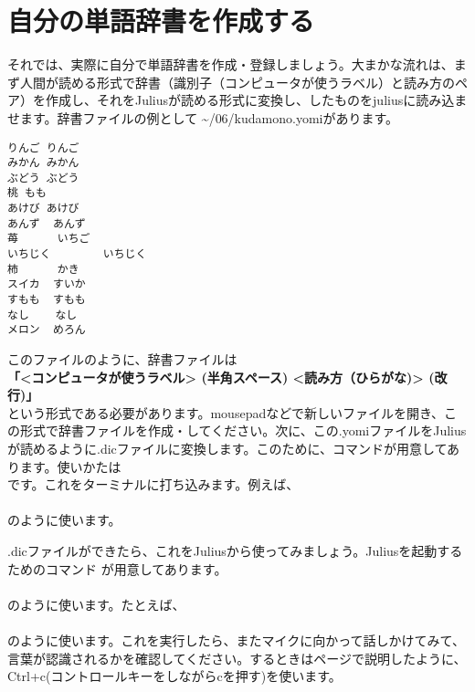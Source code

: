 \newpage
\section{自分の単語辞書を作成する}
それでは、実際に自分で単語辞書を作成・登録しましょう。大まかな流れは、まず人間が読める形式で辞書（識別子（コンピュータが使うラベル）と読み方のペア）を作成し、それをJuliusが読める形式に変換し、したものをjuliusに読み込ませます。辞書ファイルの例として \textasciitilde /06/kudamono.yomiがあります。\\

\begin{lstlisting}[caption=kudamino.yomi,label=kudamino.yomi]
りんご りんご
みかん みかん
ぶどう ぶどう
桃 もも
あけび あけび
あんず  あんず
苺      いちご
いちじく        いちじく
柿      かき
スイカ  すいか
すもも  すもも
なし    なし
メロン  めろん
\end{lstlisting}

このファイルのように、辞書ファイルは\\
\textbf{「<コンピュータが使うラベル> (半角スペース) <読み方（ひらがな)> (改行)」}\\
という形式である必要があります。mousepadなどで新しいファイルを開き、この形式で辞書ファイルを作成・してください。次に、この.yomiファイルをJuliusが読めるように.dicファイルに変換します。このために、コマンドが用意してあります。使いかたは\\
です。これをターミナルに打ち込みます。例えば、\\
\\
のように使います。

.dicファイルができたら、これをJuliusから使ってみましょう。Juliusを起動するためのコマンド  が用意してあります。\\
\\
のように使います。たとえば、\\
\\
のように使います。これを実行したら、またマイクに向かって話しかけてみて、言葉が認識されるかを確認してください。するときは\pageref{Julius}ページで説明したように、Ctrl+c(コントロールキーをしながらcを押す)を使います。

\begin{tcolorbox}[title=\useOmetoi]
\begin{enumerate}
\end{enumerate}
\end{tcolorbox}
